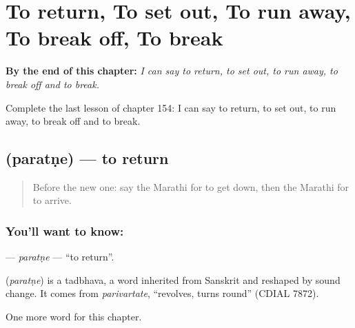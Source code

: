 
\chapter{To return, To set out, To run away, To break off, To break}
\label{ch:mr-to-return-to-set-out-to-run-away-to-break-off-to-break}

\begin{chapteropening}
\textbf{By the end of this chapter:} \emph{I can say to return, to set out, to run away, to break off and to break.}

Complete the last lesson of chapter 154: I can say to return, to set out, to run away, to break off and to break.
\end{chapteropening}

\section[\texorpdfstring{\mr{परतणे} (paratṇe)}{परतणे (paratṇe)}]{ (paratṇe) — to return}

\label{lesson:MR-C154-paratne}



\begin{quote}
Before the new one: say the Marathi for to get down, then the Marathi for to arrive.
\end{quote}

\subsection*{You'll want to know: }
\textbf{} — \emph{paratṇe} — \textquotedblleft{}to return\textquotedblright{}.

\begin{cousinweb}
\textbf{} (\emph{paratṇe}) is a tadbhava, a word inherited from Sanskrit and reshaped by sound change. It comes from \emph{parivartate}, \textquotedblleft{}revolves, turns round\textquotedblright{} (CDIAL 7872).
\end{cousinweb}

\begin{grammarlens}[title={What you've built}]
One more word for this chapter.
\end{grammarlens}

